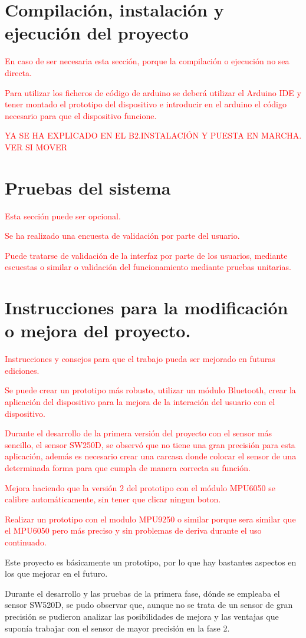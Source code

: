 \section{Compilación, instalación y ejecución del proyecto}

\textcolor{red}{En caso de ser necesaria esta sección, porque la compilación o ejecución no sea directa.}

\textcolor{red}{Para utilizar los ficheros de código de arduino se deberá utilizar el Arduino IDE y tener montado el prototipo del dispositivo e introducir en el arduino el código necesario para que el dispositivo funcione.}

\textcolor{red}{YA SE HA EXPLICADO EN EL B2.INSTALACIÓN Y PUESTA EN MARCHA. VER SI MOVER}

\section{Pruebas del sistema}
\textcolor{red}{Esta sección puede ser opcional.}

\textcolor{red}{Se ha realizado una encuesta de validación por parte del usuario.}

\textcolor{red}{Puede tratarse de validación de la interfaz por parte de los usuarios, mediante escuestas o similar o validación del funcionamiento mediante pruebas unitarias.}



\section{Instrucciones para la modificación o mejora del proyecto.}

\textcolor{red}{Instrucciones y consejos para que el trabajo pueda ser mejorado en futuras ediciones.}

\textcolor{red}{Se puede crear un prototipo más robusto, utilizar un módulo Bluetooth, crear la aplicación del dispositivo para la mejora de la interación del usuario con el dispositivo.}

\textcolor{red}{Durante el desarrollo de la primera versión del proyecto con el sensor más sencillo, el sensor SW250D, se observó que no tiene una gran precisión para esta aplicación, además es necesario crear una carcasa donde colocar el sensor de una determinada forma para que cumpla de manera correcta su función.}


\textcolor{red}{Mejora haciendo que la versión 2 del prototipo con el módulo MPU6050 se calibre automáticamente, sin tener que clicar ningun boton.}

\textcolor{red}{Realizar un prototipo con el modulo MPU9250 o similar porque sera similar que el MPU6050 pero más preciso y sin problemas de deriva durante el uso continuado.}

Este proyecto es básicamente un prototipo, por lo que hay bastantes aspectos en los que mejorar en el futuro.

Durante el desarrollo y las pruebas de la primera fase, dónde se empleaba el sensor SW520D, se pudo observar que, aunque no se trata de un sensor de gran precisión se pudieron analizar las posibilidades de mejora y las ventajas que suponía trabajar con el sensor de mayor precisión en la fase 2.